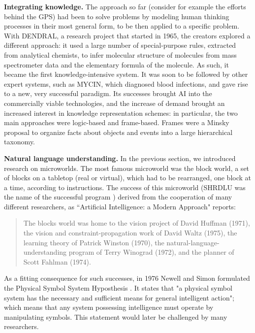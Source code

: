 \documentclass[../main.tex]{subfiles}
\begin{document}
\vspace{4pt}
\textbf{Integrating knowledge.} The approach so far (consider for example the efforts behind the GPS) had been to solve problems by modeling human thinking processes in their most general form, to be then applied to a specific problem. With DENDRAL, a research project that started in 1965, the creators explored a different approach: it used a large number of special-purpose rules, extracted from analytical chemists, to infer molecular structure of molecules from mass spectrometer data and the elementary formula of the molecule. As such, it became the first knowledge-intensive system. It was soon to be followed by other expert systems, such as MYCIN, which diagnosed blood infections, and gave rise to a new, very successful paradigm. Its successes brought AI into the commercially viable technologies, and the increase of demand brought an increased interest in knowledge representation schemes: in particular, the two main approaches were logic-based and frame-based. Frames were a Minsky proposal\cite{minskyFrameworkRepresentingKnowledge1975} to organize facts about objects and events into a large hierarchical taxonomy.

\vspace{4pt}
\textbf{Natural language understanding.} In the previous section, we introduced research on microworlds.
The most famous microworld was the block world, a set of blocks on a tabletop (real or virtual), which had to be rearranged, one block at a time, according to instructions. The success of this microworld (SHRDLU was the name of the successful program \cite{winogradProceduresRepresentationData1971}) derived from the cooperation of many different researchers, as ``Artificial Intelligence: a Modern Approach" reports:

\begin{quote}
    The blocks world was home to the vision project of David Huffman (1971), the vision and constraint-propagation work of David Waltz (1975), the learning theory of Patrick Winston (1970), the natural-language-understanding program of Terry Winograd (1972), and the planner of Scott Fahlman (1974).
\end{quote}\cite{russellArtificialIntelligenceModern2002}
As a fitting consequence for such successes, in 1976 Newell and Simon formulated the Physical Symbol System Hyposthesis \cite{newellComputerScienceEmpirical1976}. It states that "a physical symbol system has the necessary and sufficient means for general intelligent action"; which means that any system possessing intelligence must operate by manipulating symbols. This statement would later be challenged by many researchers.
\end{document}
